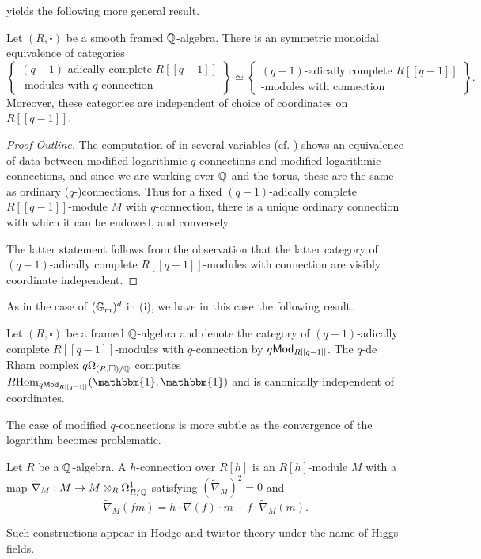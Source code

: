  yields the following more general result. 
\begin{proposition}\label{prop: R-modules with ordinary connection}
    Let $(R,\square)$ be a smooth framed $\mathbb{Q}$-algebra. There is an symmetric monoidal equivalence of categories 
    $$\left\{\substack{(q-1)\text{-adically complete }R[[q-1]] \\ \text{-modules with }q\text{-connection}}\right\}\simeq\left\{\substack{(q-1)\text{-adically complete }R[[q-1]] \\ \text{-modules with connection}}\right\}.$$
    Moreover, these categories are independent of choice of coordinates on $R[[q-1]]$. 
\end{proposition}
\begin{proof}[Proof Outline]
    The computation of  in several variables (cf. \cite[Lem. 4.1]{qDeformations}) shows an equivalence of data between modified logarithmic $q$-connections and modified logarithmic connections, and since we are working over $\mathbb{Q}$ and the torus, these are the same as ordinary ($q$-)connections. Thus for a fixed $(q-1)$-adically complete $R[[q-1]]$-module $M$ with $q$-connection, there is a unique ordinary connection with which it can be endowed, and conversely.
    
    The latter statement follows from the observation that the latter category of $(q-1)$-adically complete $R[[q-1]]$-modules with connection are visibly coordinate independent. 
\end{proof}
As in the case of $(\mathbb{G}_{m})^{d}$ in  (i), we have in this case the following result. 
\begin{corollary}\label{corr: modules with q-connection are coordinate independent}
    Let $(R,\square)$ be a framed $\mathbb{Q}$-algebra and denote the category of $(q-1)$-adically complete $R[[q-1]]$-modules with $q$-connection by $q\mathsf{Mod}_{R[[q-1]]}$. The $q$-de Rham complex $q\Omega_{(R,\square)/\mathbb{Q}}$ computes $R\Hom_{q\Mod_{R[[q-1]]}}(\mathbbm{1},\mathbbm{1})$ and is canonically independent of coordinates. 
\end{corollary}
The case of modified $q$-connections is more subtle as the convergence of the logarithm becomes problematic. 
\begin{definition}\label{def: logarithmic q-connection}
    Let $R$ be a $\mathbb{Q}$-algebra. A $h$-connection over $R[h]$ is an $R[h]$-module $M$ with a map $\widetilde{\nabla}_{M}:M\to M\otimes_{R}\Omega^{1}_{R/\mathbb{Q}}$ satisfying $(\widetilde{\nabla}_{M})^{2}=0$ and 
    $$\widetilde{\nabla}_{M}(fm)=h\cdot\nabla(f)\cdot m+f\cdot\widetilde{\nabla}_{M}(m).$$
\end{definition}
Such constructions appear in Hodge and twistor theory under the name of Higgs fields. 

